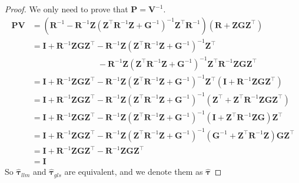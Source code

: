 \documentclass[
  a4paper,
  oneside,
  openany,
  12pt,
  onecolumn]{book}
\theoremstyle{plain}
\theoremstyle{definition}
\theoremstyle{remark}
\begin{document}
\begin{proof}
We only need to prove that \(\boldsymbol{P}=\boldsymbol{V}^{-1}\).
\begin{align*}
\boldsymbol{P}\boldsymbol{V} &=(\boldsymbol{R}^{-1}-\boldsymbol{R}^{-1}\boldsymbol{Z}(\boldsymbol{Z}^\top\boldsymbol{R}^{-1}\boldsymbol{Z}+\boldsymbol{G}^{-1})^{-1}\boldsymbol{Z}^\top\boldsymbol{R}^{-1})(\boldsymbol{R}+\boldsymbol{Z}\boldsymbol{G}\boldsymbol{Z}^\top)\\
&= \boldsymbol{I} + \boldsymbol{R}^{-1}\boldsymbol{Z}\boldsymbol{G}\boldsymbol{Z}^\top - \boldsymbol{R}^{-1}\boldsymbol{Z}(\boldsymbol{Z}^\top\boldsymbol{R}^{-1}\boldsymbol{Z}+\boldsymbol{G}^{-1})^{-1}\boldsymbol{Z}^\top \\
&\quad \quad \quad \quad \quad \quad\quad\quad -\boldsymbol{R}^{-1}\boldsymbol{Z}(\boldsymbol{Z}^\top\boldsymbol{R}^{-1}\boldsymbol{Z}+\boldsymbol{G}^{-1})^{-1}\boldsymbol{Z}^\top\boldsymbol{R}^{-1}\boldsymbol{Z}\boldsymbol{G}\boldsymbol{Z}^\top\\
&=\boldsymbol{I} + \boldsymbol{R}^{-1}\boldsymbol{Z}\boldsymbol{G}\boldsymbol{Z}^\top -\boldsymbol{R}^{-1}\boldsymbol{Z}(\boldsymbol{Z}^\top\boldsymbol{R}^{-1}\boldsymbol{Z}+\boldsymbol{G}^{-1})^{-1}\boldsymbol{Z}^\top(\boldsymbol{I}+\boldsymbol{R}^{-1}\boldsymbol{Z}\boldsymbol{G}\boldsymbol{Z}^\top)\\
&=\boldsymbol{I} + \boldsymbol{R}^{-1}\boldsymbol{Z}\boldsymbol{G}\boldsymbol{Z}^\top -\boldsymbol{R}^{-1}\boldsymbol{Z}(\boldsymbol{Z}^\top\boldsymbol{R}^{-1}\boldsymbol{Z}+\boldsymbol{G}^{-1})^{-1}(\boldsymbol{Z}^\top+\boldsymbol{Z}^\top\boldsymbol{R}^{-1}\boldsymbol{Z}\boldsymbol{G}\boldsymbol{Z}^\top)\\
&= \boldsymbol{I} + \boldsymbol{R}^{-1}\boldsymbol{Z}\boldsymbol{G}\boldsymbol{Z}^\top -\boldsymbol{R}^{-1}\boldsymbol{Z}(\boldsymbol{Z}^\top\boldsymbol{R}^{-1}\boldsymbol{Z}+\boldsymbol{G}^{-1})^{-1}(\boldsymbol{I}+\boldsymbol{Z}^\top\boldsymbol{R}^{-1}\boldsymbol{Z}\boldsymbol{G})\boldsymbol{Z}^\top\\
&= \boldsymbol{I} + \boldsymbol{R}^{-1}\boldsymbol{Z}\boldsymbol{G}\boldsymbol{Z}^\top -\boldsymbol{R}^{-1}\boldsymbol{Z}(\boldsymbol{Z}^\top\boldsymbol{R}^{-1}\boldsymbol{Z}+\boldsymbol{G}^{-1})^{-1}(\boldsymbol{G}^{-1}+\boldsymbol{Z}^\top\boldsymbol{R}^{-1}\boldsymbol{Z})\boldsymbol{G}\boldsymbol{Z}^\top\\
&= \boldsymbol{I}+\boldsymbol{R}^{-1}\boldsymbol{Z}\boldsymbol{G}\boldsymbol{Z}^\top-\boldsymbol{R}^{-1}\boldsymbol{Z}\boldsymbol{G}\boldsymbol{Z}^\top\\
& = \boldsymbol{I}
\end{align*} So \(\hat{\boldsymbol{\tau}}_{llm}\) and
\(\hat{\boldsymbol{\tau}}_{gls}\) are equivalent, and we denote them as
\(\hat{\boldsymbol{\tau}}\)
\end{proof}
\end{document}
